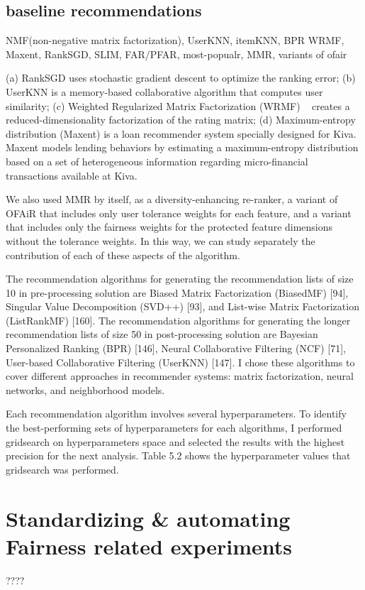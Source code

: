     
    
    
    \subsection{baseline recommendations}
        NMF(non-negative matrix factorization), UserKNN, itemKNN, BPR WRMF, Maxent, RankSGD, SLIM, FAR/PFAR, most-popualr, MMR, variants of ofair
        
        (a) RankSGD \cite{pmlr-v18-jahrer12b} uses stochastic gradient descent to optimize the ranking error; (b) UserKNN \cite{resnick1997recommender}  is a memory-based collaborative algorithm that computes user similarity; (c) Weighted Regularized Matrix Factorization (WRMF) ~\cite{hu2008collaborative} creates a reduced-dimensionality factorization of the rating matrix; (d) Maximum-entropy distribution (Maxent) \cite{choo2014gather} is a loan recommender system specially designed for Kiva. Maxent models lending behaviors by estimating a maximum-entropy distribution based on a set of heterogeneous information regarding micro-financial transactions available at Kiva.
        
        
        We also used MMR by itself, as a diversity-enhancing re-ranker, a variant of OFAiR that includes only user tolerance weights for each feature, and a variant that includes only the fairness weights for the protected feature dimensions without the tolerance weights. In this way, we can study separately the contribution of each of these aspects of the algorithm.
        
        
        The recommendation algorithms for generating the recommendation lists of size 10 in pre-processing solution are Biased Matrix Factorization (BiasedMF) [94], Singular Value Decomposition (SVD++) [93], and List-wise Matrix Factorization (ListRankMF) [160]. The recommendation algorithms for generating the longer recommendation lists of size 50 in post-processing solution are Bayesian Personalized Ranking (BPR) [146], Neural Collaborative Filtering (NCF) [71], User-based Collaborative Filtering (UserKNN) [147]. I chose these algorithms to cover different approaches in recommender systems: matrix factorization, neural networks, and neighborhood models.
        
        Each recommendation algorithm involves several hyperparameters. To identify the best-performing sets of hyperparameters for each algorithms, I performed gridsearch on hyperparameters space and selected the results with the highest precision for the next analysis. Table 5.2 shows the hyperparameter values that gridsearch was performed.
        
\section{Standardizing & automating Fairness related experiments}
????
